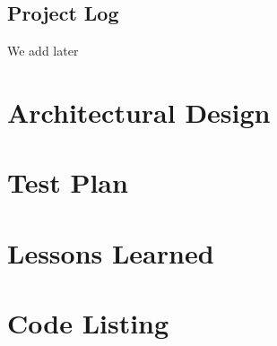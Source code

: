 \documentclass[11pt]{report}
\begin{document}
\section{Project Log}
We add later 

\chapter{Architectural Design}
\chapter{Test Plan}
\chapter{Lessons Learned}
\appendix
\chapter{Code Listing}







\end{document}
